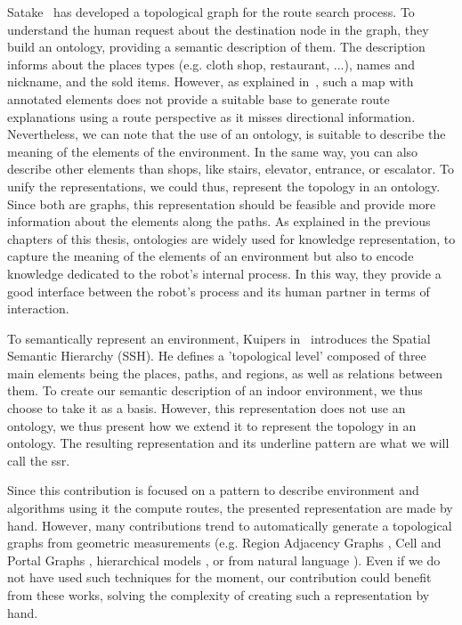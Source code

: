 Satake~\cite{satake_2015_field} has developed a topological graph for the route search process. To understand the human request about the destination node in the graph, they build an ontology, providing a semantic description of them. The description informs about the places types (e.g. cloth shop, restaurant, ...), names and nickname, and the sold items. However, as explained in~\cite{morales_2015_building}, such a map with annotated elements does not provide a suitable base to generate route explanations using a route perspective as it misses directional information. Nevertheless, we can note that the use of an ontology, is suitable to describe the meaning of the elements of the environment. In the same way, you can also describe other elements than shops, like stairs, elevator, entrance, or escalator. To unify the representations, we could thus, represent the topology in an ontology. Since both are graphs, this representation should be feasible and provide more information about the elements along the paths. As explained in the previous chapters of this thesis, ontologies are widely used for knowledge representation, to capture the meaning of the elements of an environment but also to encode knowledge dedicated to the robot's internal process. In this way, they provide a good interface between the robot's process and its human partner in terms of interaction.%

To semantically represent an environment, Kuipers in~\cite{kuipers_2000_spatial} introduces the Spatial Semantic Hierarchy (SSH). He defines a 'topological level' composed of three main elements being the places, paths, and regions, as well as relations between them. To create our semantic description of an indoor environment, we thus choose to take it as a basis. However, this representation does not use an ontology, we thus present how we extend it to represent the topology in an ontology. The resulting representation and its underline pattern are what we will call the \acrfull{ssr}.

Since this contribution is focused on a pattern to describe environment and algorithms using it the compute routes, the presented representation are made by hand. However, many contributions trend to automatically generate a topological graphs from geometric measurements (e.g. Region Adjacency Graphs \cite{kuipers_2004_local}, Cell and Portal Graphs \cite{lefebvre_2003_automatic}, hierarchical models \cite{lorenz_2006_hybrid}, or from natural language \cite{hemachandra_2014_learning}). Even if we do not have used such techniques for the moment, our contribution could benefit from these works, solving the complexity of creating such a representation by hand.

